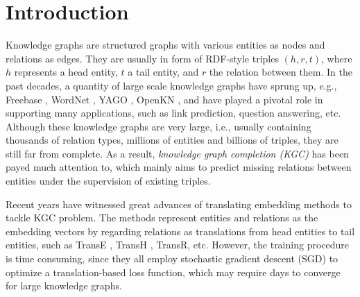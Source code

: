 \documentclass[sigconf]{acmart}
\begin{document}





\maketitle

\section{Introduction}




Knowledge graphs are structured graphs with various entities as nodes and relations as edges. 
They are usually in form of RDF-style triples $(h,r,t)$, where $h$ represents a head entity, $t$ a tail entity, and $r$ the relation between them. 
In the past decades, a quantity of large scale knowledge graphs have sprung up, e.g., Freebase \cite{bollacker2008freebase}, WordNet \cite{miller1995wordnet}, YAGO \cite{Mahdisoltani2014YAGO3}, OpenKN \cite{jia2014openkn}, and  have played a pivotal role in supporting many applications, such as link prediction, question answering, etc.
Although these knowledge graphs are very large, i.e., usually containing thousands of relation types, millions of entities and billions of triples, they are still far from complete. 
As a result, \emph{knowledge graph completion (KGC)} has been payed much attention to, which mainly aims to predict missing relations between entities under the supervision of existing triples. 


Recent years have witnessed great advances of translating embedding methods to tackle KGC problem. The methods represent entities and relations as the embedding vectors by regarding relations as translations from head entities to tail entities, such as TransE \cite{bordes2013translating}, TransH \cite{Wang2014Knowledge}, TransR\cite{Lin2015Learning}, etc.
However, the training procedure is time consuming, 
since they all employ stochastic gradient descent (SGD) to optimize a translation-based loss function, which may require days to converge for large knowledge graphs. 
\end{document}

